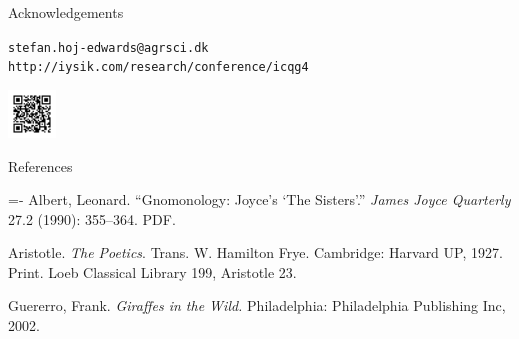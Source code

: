 \documentclass[landscape,a3paper,fontscale=0.75,margin=0.4cm]{baposter}
\begin{document}
\begin{poster}
\begin{posterbox}[name=ack,column=2,below=genome]{Acknowledgements}
   \vspace{1em}
	 
\begin{flushright}

	 \begin{minipage}[c]{0.7\linewidth}
	 	 \vspace{0.2in}
		 \begin{flushright}
		 	 \footnotesize{ 
		 	   \hfill \texttt{stefan.hoj-edwards@agrsci.dk}
		 	   \newline
  	 	 	 \texttt{http://iysik.com/research/conference/icqg4} 
  	 	 }
  	 \end{flushright}   	 
 	 \end{minipage}
 	 \hspace{0.1em}
   \begin{minipage}[c]{0.15\linewidth}
		  \includegraphics[width=0.5in,height=0.5in,trim=0.2in 0.2in 0.2in 0.2in,clip=true]{datamatrix.png}    
	 \end{minipage} 	 

\end{flushright}
   
\end{posterbox}

\begin{posterbox}[name=ref,column=0,below=genome]{References} 
  \footnotesize\par\begingroup
    \leftskip=0.5in \parindent=-\leftskip
    Albert, Leonard. ``Gnomonology: Joyce's `The Sisters'.'' \textit{James Joyce Quarterly} 27.2 (1990): 355--364. PDF.

    Aristotle. \textit{The Poetics}. Trans. W. Hamilton Frye. Cambridge: Harvard UP, 1927. Print. Loeb Classical Library 199, Aristotle 23. 
    
    Guererro, Frank. \emph{Giraffes in the Wild.} Philadelphia: Philadelphia Publishing Inc, 2002.
  \par\endgroup
\end{posterbox}



\end{poster}
\end{document}
